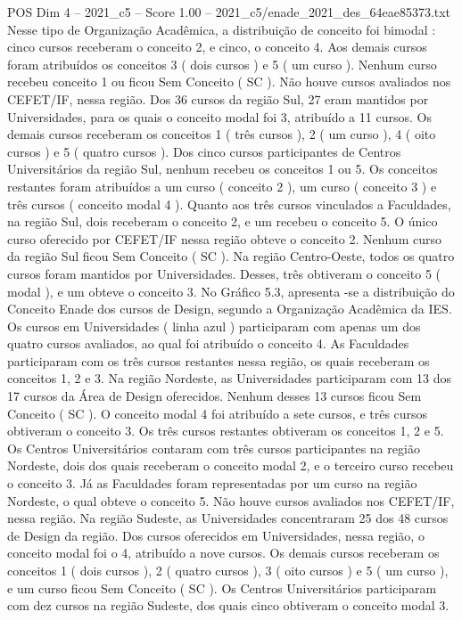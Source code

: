 \begin{textsample}{POS Dim 4 – 2021\_c5 – Score 1.00 – 2021\_c5/enade\_2021\_des\_64eae85373.txt}
Nesse tipo de Organização Acadêmica, a distribuição de conceito foi bimodal : cinco cursos receberam o conceito 2, e cinco, o conceito 4.
Aos demais cursos foram atribuídos os conceitos 3 ( dois cursos ) e 5 ( um curso ).
Nenhum curso recebeu conceito 1 ou ficou Sem Conceito ( SC ).
Não houve cursos avaliados nos CEFET/IF, nessa região.
Dos 36 cursos da região Sul, 27 eram mantidos por Universidades, para os quais o conceito modal foi 3, atribuído a 11 cursos.
Os demais cursos receberam os conceitos 1 ( três cursos ), 2 ( um curso ), 4 ( oito cursos ) e 5 ( quatro cursos ).
Dos cinco cursos participantes de Centros Universitários da região Sul, nenhum recebeu os conceitos 1 ou 5.
Os conceitos restantes foram atribuídos a um curso ( conceito 2 ), um curso ( conceito 3 ) e três cursos ( conceito modal 4 ).
Quanto aos três cursos vinculados a Faculdades, na região Sul, dois receberam o conceito 2, e um recebeu o conceito 5.
O único curso oferecido por CEFET/IF nessa região obteve o conceito 2.
Nenhum curso da região Sul ficou Sem Conceito ( SC ).
Na região Centro-Oeste, todos os quatro cursos foram mantidos por Universidades.
Desses, três obtiveram o conceito 5 ( modal ), e um obteve o conceito 3.
No Gráfico 5.3, apresenta -se a distribuição do Conceito Enade dos cursos de Design, segundo a Organização Acadêmica da IES.
Os cursos em Universidades ( linha azul ) participaram com apenas um dos quatro cursos avaliados, ao qual foi atribuído o conceito 4.
As Faculdades participaram com os três cursos restantes nessa região, os quais receberam os conceitos 1, 2 e 3.
Na região Nordeste, as Universidades participaram com 13 dos 17 cursos da Área de Design oferecidos.
Nenhum desses 13 cursos ficou Sem Conceito ( SC ).
O conceito modal 4 foi atribuído a sete cursos, e três cursos obtiveram o conceito 3.
Os três cursos restantes obtiveram os conceitos 1, 2 e 5.
Os Centros Universitários contaram com três cursos participantes na região Nordeste, dois dos quais receberam o conceito modal 2, e o terceiro curso recebeu o conceito 3.
Já as Faculdades foram representadas por um curso na região Nordeste, o qual obteve o conceito 5.
Não houve cursos avaliados nos CEFET/IF, nessa região.
Na região Sudeste, as Universidades concentraram 25 dos 48 cursos de Design da região.
Dos cursos oferecidos em Universidades, nessa região, o conceito modal foi o 4, atribuído a nove cursos.
Os demais cursos receberam os conceitos 1 ( dois cursos ), 2 ( quatro cursos ), 3 ( oito cursos ) e 5 ( um curso ), e um curso ficou Sem Conceito ( SC ).
Os Centros Universitários participaram com dez cursos na região Sudeste, dos quais cinco obtiveram o conceito modal 3.

\end{textsample}
